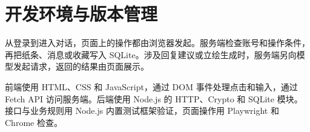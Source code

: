 \section{开发环境与版本管理}
从登录到进入对话，页面上的操作都由浏览器发起。服务端检查账号和操作条件，再把纸条、消息或收藏写入 SQLite。涉及回复建议或立绘生成时，服务端另向模型发起请求，返回的结果由页面展示。

前端使用 HTML、CSS 和 JavaScript，通过 DOM 事件处理点击和输入，通过 Fetch API 访问服务端。后端使用 Node.js 的 HTTP、Crypto 和 SQLite 模块。接口与业务规则用 Node.js 内置测试框架验证，页面操作用 Playwright 和 Chrome 检查。
